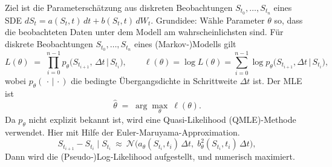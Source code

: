 \begin{lemma}
Ziel ist die Parameterschätzung aus diskreten Beobachtungen $S_{t_0},\dots,S_{t_n}$ eines SDE
$dS_t=a(S_t,t)\,dt+b(S_t,t)\,dW_t$. Grundidee: Wähle Parameter $\theta$ so, dass die beobachteten Daten unter dem Modell am wahrscheinlichsten sind. Für diskrete Beobachtungen $S_{t_0},\dots,S_{t_n}$ eines (Markov‑)Modells gilt
$$
L(\theta) \;=\; \prod_{i=0}^{n-1} p_\theta\!\big(S_{t_{i+1}},\,\Delta t \,\big|\, S_{t_i}\big), 
\qquad
\ell(\theta)=\log L(\theta)=\sum_{i=0}^{n-1}\log p_\theta\!\big(S_{t_{i+1}},\Delta t \,\big|\, S_{t_i}\big),
$$
wobei $p_\theta(\,\cdot\,|\,\cdot)$ die bedingte Übergangsdichte in Schrittweite $\Delta t$ ist. Der MLE ist
$$
\widehat\theta\;=\;\arg\max_{\theta}\ \ell(\theta).
$$
Da $p_\theta$ nicht explizit bekannt ist, wird eine Quasi-Likelihood (QMLE)-Methode verwendet. Hier mit Hilfe der Euler-Maruyama-Approximation.
$$
S_{t_{i+1}}-S_{t_i}\mid S_{t_i}\ \approx\ \mathcal N\!\big(a_\theta(S_{t_i},t_i)\,\Delta t,\; b_\theta^2(S_{t_i},t_i)\,\Delta t\big),
$$
Dann wird die (Pseudo‑)Log‑Likelihood aufgestellt, und numerisch maximiert.
\end{lemma}

